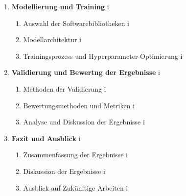 {\begin{enumerate}[label=\arabic*,font=\bfseries]
    \item \textbf{Modellierung und Training} \secdotfill  i
        \begin{enumerate}[label*=.\arabic*]
            \item Auswahl der Softwarebibliotheken \subsecdotfill i
            \item Modellarchitektur \subsecdotfill i
            \item Trainingsprozess und Hyperparameter-Optimierung \subsecdotfill i

        \end{enumerate}

    \item \textbf{Validierung und Bewertng der Ergebnisse} \secdotfill i
        \begin{enumerate}[label*=.\arabic*]
            \item  Methoden der Validierung \subsecdotfill i
            \item Bewertungsmethoden und Metriken \subsecdotfill i
            \item Analyse und Diskussion der Ergebnisse \subsecdotfill i

        \end{enumerate}

    
    \item \textbf{Fazit und Ausblick} \secdotfill  i
        \begin{enumerate}[label*=.\arabic*]
            \item  Zusammenfassung der Ergebnisse \subsecdotfill i
            \item Diskussion der Ergebnisse \subsecdotfill i
            \item Ausblick auf Zukünftige Arbeiten \subsecdotfill i

        \end{enumerate}
    
    \preliminaryTOCend
 
\end{enumerate}
}